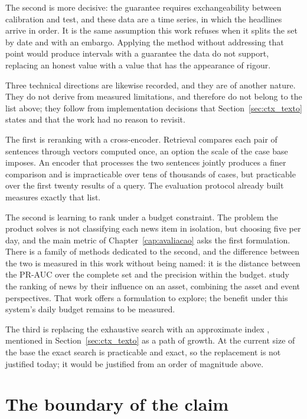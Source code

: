 The second is more decisive: the guarantee requires exchangeability between calibration and test,
and these data are a time series, in which the headlines arrive in order. It is the same assumption
this work refuses when it splits the set by date and with an embargo. Applying the method without
addressing that point would produce intervals with a guarantee the data do not support, replacing
an honest value with a value that has the appearance of rigour.

Three technical directions are likewise recorded, and they are of another nature. They do not
derive from measured limitations, and therefore do not belong to the list above; they follow from
implementation decisions that Section~\ref{sec:ctx_texto} states and that the work had no reason
to revisit.

The first is reranking with a cross-encoder. Retrieval compares each pair of sentences through
vectors computed once, an option the scale of the case base imposes. An encoder that processes the
two sentences jointly produces a finer comparison and is impracticable over tens of thousands of
cases, but practicable over the first twenty results of a query. The evaluation protocol already
built measures exactly that list.

The second is learning to rank under a budget constraint. The problem the product solves is not
classifying each news item in isolation, but choosing five per day, and the main metric of
Chapter~\ref{cap:avaliacao} asks the first formulation. There is a family of methods dedicated to
the second, and the difference between the two is measured in this work without being named: it is
the distance between the PR-AUC over the complete set and the precision within the budget.
\textcite{feng2021hybrid} study the ranking of news by their influence on an asset, combining
the asset and event perspectives. That work offers a formulation to explore; the benefit under
this system's daily budget remains to be measured.

The third is replacing the exhaustive search with an approximate index
\autocite{johnson2021faiss}, mentioned in Section~\ref{sec:ctx_texto} as a path of growth. At the
current size of the base the exact search is practicable and exact, so the replacement is not
justified today; it would be justified from an order of magnitude above.

\section{The boundary of the claim}
\label{sec:con_final}

